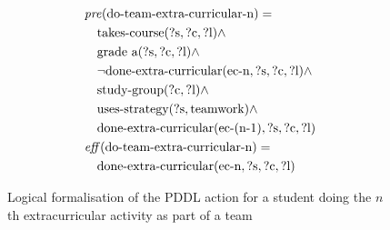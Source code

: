 \begin{figure}[t]
  \small  %
  \begin{align*}
  &\mathit{pre}(\text{do-team-extra-curricular-n}) = \\
  &\quad \text{takes-course}(\text{?s}, \text{?c}, \text{?l}) \land \\
  &\quad \text{grade a}(\text{?s}, \text{?c}, \text{?l}) \land \\
  &\quad \lnot \text{done-extra-curricular}(\text{ec-n}, \text{?s}, \text{?c}, \text{?l}) \land \\
  &\quad \text{study-group}(\text{?c}, \text{?l}) \land \\
  &\quad \text{uses-strategy}(\text{?s}, \text{teamwork}) \land \\
  &\quad \text{done-extra-curricular}(\text{ec-(n-1)}, \text{?s}, \text{?c}, \text{?l}) \\
  &\mathit{eff}(\text{do-team-extra-curricular-n}) = \\
  &\quad \text{done-extra-curricular}(\text{ec-n}, \text{?s}, \text{?c}, \text{?l})
  \end{align*}
  \caption{Logical formalisation of the PDDL action for a student doing the $n$th extracurricular activity as part of a team}\label{fig:team-extra-curricular-n}
\end{figure}
